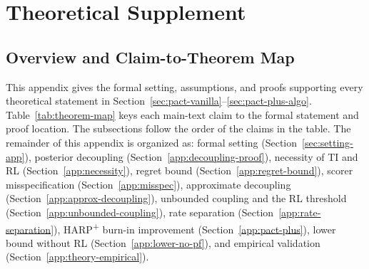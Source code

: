 \section{Theoretical Supplement}
\label{app:theory}

\subsection{Overview and Claim-to-Theorem Map}
\label{app:theory-overview}

This appendix gives the formal setting, assumptions, and proofs supporting every theoretical statement in Section~\ref{sec:pact-vanilla}--\ref{sec:pact-plus-algo}. Table~\ref{tab:theorem-map} keys each main-text claim to the formal statement and proof location. The subsections follow the order of the claims in the table. The remainder of this appendix is organized as: formal setting (Section~\ref{sec:setting-app}), posterior decoupling (Section~\ref{app:decoupling-proof}), necessity of TI and RL (Section~\ref{app:necessity}), regret bound (Section~\ref{app:regret-bound}), scorer misspecification (Section~\ref{app:misspec}), approximate decoupling (Section~\ref{app:approx-decoupling}), unbounded coupling and the RL threshold (Section~\ref{app:unbounded-coupling}), rate separation (Section~\ref{app:rate-separation}), HARP\textsuperscript{+} burn-in improvement (Section~\ref{app:pact-plus}), lower bound without RL (Section~\ref{app:lower-no-pf}), and empirical validation (Section~\ref{app:theory-empirical}).

